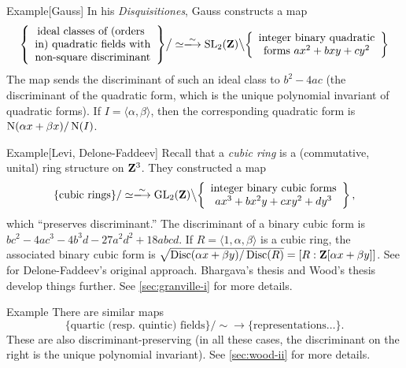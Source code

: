 \begin{enonce}[remark]{Example}[Gauss]
In his \emph{Disquisitiones}, Gauss constructs a map 
\[
  \left\{\begin{array}{c}\text{ideal classes of (orders } \\ \text{in) quadratic fields with} \\ \text{non-square discriminant}\end{array}\right\}\bigr/\simeq 
  \iso 
  \speciallinear_2(\dZ)\bigl\backslash \left\{\begin{array}{c}\text{integer binary quadratic} \\ \text{forms }a x^2+b x y+c y^2\end{array} \right\} 
\]
The map sends the discriminant of such an ideal class to $b^2-4 a c$ (the 
discriminant of the quadratic form, which is the unique polynomial invariant 
of quadratic forms). If $I=\langle \alpha,\beta\rangle$, then 
the corresponding quadratic form is $\operatorname{N}(\alpha x+\beta x)/\operatorname{N}(I)$. 
\end{enonce}

\begin{enonce}[remark]{Example}[Levi, Delone-Faddeev] %
Recall that a \emph{cubic ring} is a (commutative, unital) ring structure 
on $\mathbf{Z}^3$. They constructed a map 
\[
  \{\text{cubic rings}\}/\simeq \iso \generallinear_2(\dZ)\bigl\backslash\left\{\begin{array}{c}\text{integer binary cubic forms} \\ ax^3+b x^2 y+c x y^2+d y^3\end{array}\right\} ,
\]
which ``preserves discriminant.'' The discriminant of a binary cubic form is 
$b c^2-4 a c^3 - 4 b^3 d - 27 a^2 d^2 + 18 a b c d$. If 
$R=\langle 1,\alpha,\beta\rangle$ is a cubic ring, the associated binary cubic 
form is 
$\sqrt{\operatorname{Disc}(\alpha x+\beta y)/\operatorname{Disc}(R)} = [R:\mathbf{Z}[\alpha x+\beta y]]$. 
See \cite{df64} for Delone-Faddeev's original approach. Bhargava's thesis 
\cite{b01} and Wood's thesis \cite{w09} develop things further. See 
\autoref{sec:granville-i} for more details. 
\end{enonce}

\begin{enonce}[remark]{Example} %
There are similar maps 
\[
  \{\text{quartic (resp.~quintic) fields}\}/\sim \to \{\text{representations\ldots}\} .
\]
These are also discriminant-preserving (in all these cases, the discriminant on 
the right is the unique polynomial invariant). See \autoref{sec:wood-ii} for 
more details. 
\end{enonce}


